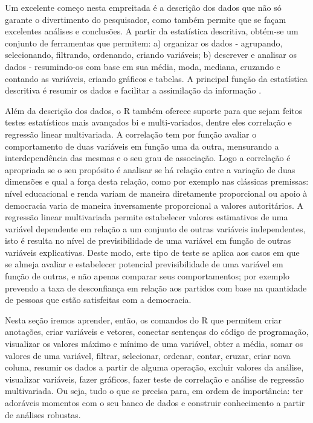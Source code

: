 \documentclass[
  brazil,
]{book}
\begin{document}
Um excelente começo nesta empreitada é a descrição dos dados que não só garante o divertimento do pesquisador, como também permite que se façam excelentes análises e conclusões. A partir da estatística descritiva, obtém-se um conjunto de ferramentas que permitem: a) organizar os dados - agrupando, selecionando, filtrando, ordenando, criando variáveis; b) descrever e analisar os dados - resumindo-os com base em sua média, moda, mediana, cruzando e contando as variáveis, criando gráficos e tabelas. A principal função da estatística descritiva é resumir os dados e facilitar a assimilação da informação \citep{agresti_metodos_2012}.

Além da descrição dos dados, o R também oferece suporte para que sejam feitos testes estatísticos mais avançados bi e multi-variados, dentre eles correlação e regressão linear multivariada. A correlação tem por função avaliar o comportamento de duas variáveis em função uma da outra, mensurando a interdependência das mesmas e o seu grau de associação. Logo a correlação é apropriada se o seu propósito é analisar se há relação entre a variação de duas dimensões e qual a força desta relação, como por exemplo nas clássicas premissas: nível educacional e renda variam de maneira diretamente proporcional ou apoio à democracia varia de maneira inversamente proporcional a valores autoritários. A regressão linear multivariada permite estabelecer valores estimativos de uma variável dependente em relação a um conjunto de outras variáveis independentes, isto é resulta no nível de previsibilidade de uma variável em função de outras variáveis explicativas. Deste modo, este tipo de teste se aplica aos casos em que se almeja avaliar e estabelecer potencial previsibilidade de uma variável em função de outras, e não apenas comparar seus comportamentos; por exemplo prevendo a taxa de desconfiança em relação aos partidos com base na quantidade de pessoas que estão satisfeitas com a democracia.

Nesta seção iremos aprender, então, os comandos do R que permitem criar anotações, criar variáveis e vetores, conectar sentenças do código de programação, visualizar os valores máximo e mínimo de uma variável, obter a média, somar os valores de uma variável, filtrar, selecionar, ordenar, contar, cruzar, criar nova coluna, resumir os dados a partir de alguma operação, excluir valores da análise, visualizar variáveis, fazer gráficos, fazer teste de correlação e análise de regressão multivariada. Ou seja, tudo o que se precisa para, em ordem de importância: ter adoráveis momentos com o seu banco de dados e construir conhecimento a partir de análises robustas.
\end{document}
